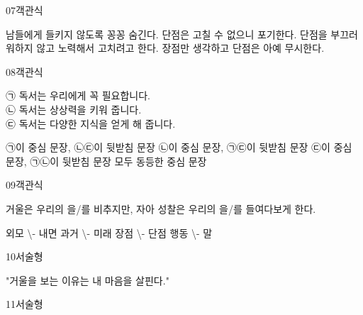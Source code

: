 \documentclass[fs12,seriesSau]{korfarm-base}
\begin{document}
\begin{kfQBlock}{07}{객관식}
\begin{kfChoices}
\kfChoice 남들에게 들키지 않도록 꽁꽁 숨긴다.
\kfChoice 단점은 고칠 수 없으니 포기한다.
\kfChoice 단점을 부끄러워하지 않고 노력해서 고치려고 한다.
\kfChoice 장점만 생각하고 단점은 아예 무시한다.
\end{kfChoices}
\end{kfQBlock}

\begin{kfQBlock}{08}{객관식}
\begin{kfEvidence}㉠ 독서는 우리에게 꼭 필요합니다. \\\relax
㉡ 독서는 상상력을 키워 줍니다. \\\relax
㉢ 독서는 다양한 지식을 얻게 해 줍니다.\end{kfEvidence}
\begin{kfChoices}
\kfChoice ㉠이 중심 문장, ㉡㉢이 뒷받침 문장
\kfChoice ㉡이 중심 문장, ㉠㉢이 뒷받침 문장
\kfChoice ㉢이 중심 문장, ㉠㉡이 뒷받침 문장
\kfChoice 모두 동등한 중심 문장
\end{kfChoices}
\end{kfQBlock}

\begin{kfQBlock}{09}{객관식}
\begin{kfEvidence}거울은 우리의 \kfFillBlank[42mm]{}을/를 비추지만, 자아 성찰은 우리의 \kfFillBlank[42mm]{}을/를 들여다보게 한다.\end{kfEvidence}
\begin{kfChoices}
\kfChoice 외모 \textbackslash{}- 내면
\kfChoice 과거 \textbackslash{}- 미래
\kfChoice 장점 \textbackslash{}- 단점
\kfChoice 행동 \textbackslash{}- 말
\end{kfChoices}
\end{kfQBlock}

\begin{kfQBlock}{10}{서술형}
\begin{kfEvidence}"거울을 보는 이유는 내 마음을 살핀다."\end{kfEvidence}
\end{kfQBlock}

\begin{kfQBlock}{11}{서술형}
\end{kfQBlock}
\end{document}

